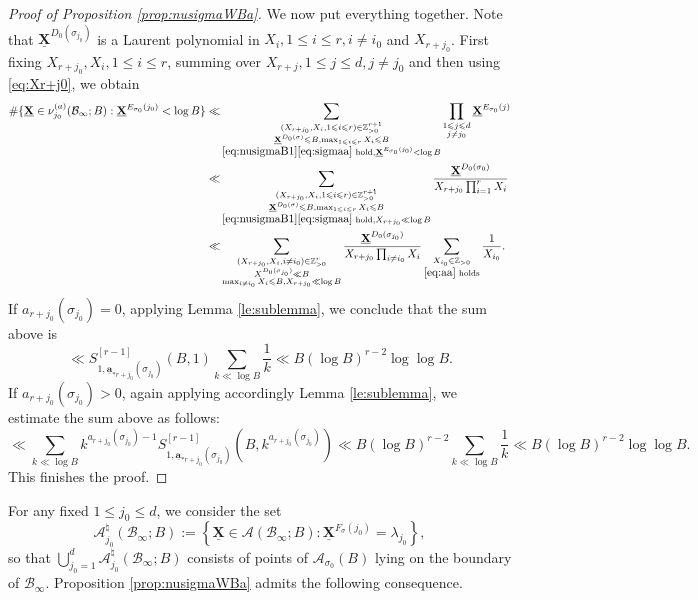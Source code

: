 \documentclass[11pt,letterpaper]{amsart}
\newcommand{\BZ}{{\mathbb {Z}}}
\newcommand{\CA}{{\mathcal {A}}}
\newcommand{\CB}{{\mathcal {B}}}
\newcommand{\XX}{\underline{\mathbf{X}}}
\renewcommand{\aa}{\underline{\mathbf{a}}}
\theoremstyle{plain}
\numberwithin{equation}{section}
\theoremstyle{definition}
\theoremstyle{remark}
\begin{document}
\begin{proof}[Proof of Proposition \ref{prop:nusigmaWBa}]
We now put everything together. Note that $\XX^{D_0(\sigma_{j_0})}$ is a Laurent polynomial in $X_i,1\leqslant i\leqslant r,i\neq i_0$ and $X_{r+j_0}$. 
First fixing $X_{r+j_0},X_i,1\leqslant i\leqslant r$, summing over $X_{r+j},1\leqslant j\leqslant d,j\neq j_0$ and then using \eqref{eq:Xr+j0}, we obtain 
\begin{align*}
	\#\{\XX\in\nu_{j_0}^{(a)}(\CB_\infty;B):\XX^{E_{\sigma_0}(j_0)}<\log B\}\ll& \sum_{\substack{(X_{r+j_0},X_i,1\leqslant i\leqslant r)\in\BZ_{>0}^{r+1}\\ \XX^{D_0(\sigma)}\leqslant B,\max_{1\leqslant i\leqslant r}X_i\leqslant B\\ \eqref{eq:nusigmaB1}\eqref{eq:sigmaa}\text{ hold}, \XX^{E_{\sigma_0}(j_0)}<\log B}}\prod_{\substack{1\leqslant j\leqslant d\\ j\neq j_0}} \XX^{E_{\sigma_0}(j)}\\ \ll & \sum_{\substack{(X_{r+j_0},X_i,1\leqslant i\leqslant r)\in\BZ_{>0}^{r+1}\\ \XX^{D_0(\sigma)}\leqslant B,\max_{1\leqslant i\leqslant r}X_i\leqslant B\\ \eqref{eq:nusigmaB1}\eqref{eq:sigmaa}\text{ hold}, X_{r+j_0}\ll\log B}}\frac{\XX^{D_0(\sigma_0)}}{X_{r+j_0}\prod_{i=1}^{r}X_i}\\ \ll &\sum_{\substack{(X_{r+j_0},X_i,i\neq i_0)\in\BZ_{>0}^{r}\\ X^{D_0(\sigma_{j_0})}\ll B\\ \max_{i\neq i_0}X_i\leqslant B,X_{r+j_0}\ll\log B}}\frac{\XX^{D_0(\sigma_{j_0})}}{X_{r+j_0}\prod_{i\neq i_0}X_i}\sum_{\substack{X_{i_0}\in\BZ_{>0}\\\eqref{eq:aa} \text{ holds}}} \frac{1}{X_{i_0}}.
\end{align*}
If $a_{r+j_0}(\sigma_{j_0})=0$, applying Lemma \ref{le:sublemma}, we conclude that the sum above is
$$\ll S^{[r-1]}_{1,\aa_{*r+j_0}(\sigma_{j_0})}(B,1)\sum_{k\ll \log B}\frac{1}{k}\ll B(\log B)^{r-2}\log\log B.$$ If $a_{r+j_0}(\sigma_{j_0})>0$, again applying accordingly Lemma \ref{le:sublemma}, we estimate the sum above as follows:
$$\ll \sum_{k\ll \log B}k^{a_{r+j_0}(\sigma_{j_0})-1}S^{[r-1]}_{1,\aa_{*r+j_0}(\sigma_{j_0})}(B,k^{a_{r+j_0}(\sigma_{j_0})})\ll B(\log B)^{r-2}\sum_{k\ll \log B}\frac{1}{k}\ll B(\log B)^{r-2}\log\log B.$$
This finishes the proof. 
\end{proof}
 For any fixed $1\leqslant j_0\leqslant d$, we consider the set \begin{equation}\label{eq:CAsigmaj0}
	\CA_{j_0}^{\natural}(\CB_\infty;B):=\left\{\XX\in\CA(\CB_\infty;B):\XX^{F_\sigma(j_0)}=\lambda_{j_0}\right\},
\end{equation} so that $\bigcup_{j_0=1}^{d}	\CA_{j_0}^{\natural}(\CB_\infty;B)$ consists of points of $\CA_{\sigma_0}(B)$ lying on the boundary of $\CB_\infty$. Proposition \ref{prop:nusigmaWBa} admits the following consequence.
\end{document}
